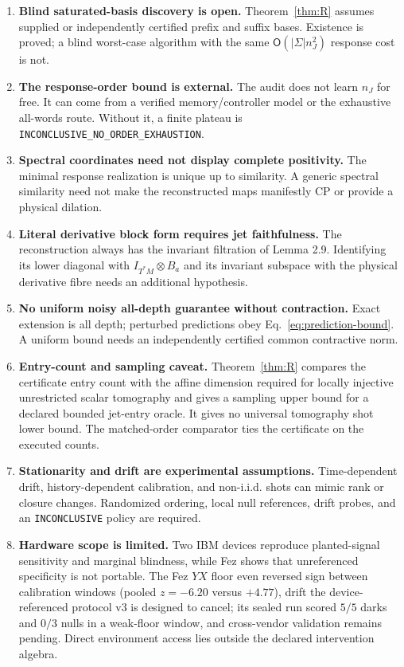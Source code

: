 \documentclass[aps,prl,reprint,superscriptaddress,nofootinbib]{revtex4-2}
\begin{document}
\begin{enumerate}
\item[O1.] \textbf{Blind saturated-basis discovery is open.}  Theorem~\ref{thm:R} assumes supplied or independently certified prefix and suffix bases.  Existence is proved; a blind worst-case algorithm with the same $\mathsf O(|\Sigma|n_J^2)$ response cost is not.

\item[O2.] \textbf{The response-order bound is external.}  The audit does not learn $n_J$ for free.  It can come from a verified memory/controller model or the exhaustive all-words route.  Without it, a finite plateau is
\texttt{INCONCLUSIVE\_}\allowbreak\texttt{NO\_ORDER\_}\allowbreak\texttt{EXHAUSTION}.

\item[O3.] \textbf{Spectral coordinates need not display complete positivity.}  The minimal response realization is unique up to similarity.  A generic spectral similarity need not make the reconstructed maps manifestly CP or provide a physical dilation.

\item[O4.] \textbf{Literal derivative block form requires jet faithfulness.}  The reconstruction always has the invariant filtration of Lemma 2.9.  Identifying its lower diagonal with $I_{T^*M}\otimes B_a$ and its invariant subspace with the physical derivative fibre needs an additional hypothesis.

\item[O5.] \textbf{No uniform noisy all-depth guarantee without contraction.}  Exact extension is all depth; perturbed predictions obey Eq.~\eqref{eq:prediction-bound}.  A uniform bound needs an independently certified common contractive norm.

\item[O6.] \textbf{Entry-count and sampling caveat.}  Theorem~\ref{thm:R} compares the certificate entry count with the affine dimension required for locally injective unrestricted scalar tomography and gives a sampling upper bound for a declared bounded jet-entry oracle.  It gives no universal tomography shot lower bound.  The matched-order comparator ties the certificate on the executed counts.

\item[O7.] \textbf{Stationarity and drift are experimental assumptions.}  Time-dependent drift, history-dependent calibration, and non-i.i.d. shots can mimic rank or closure changes.  Randomized ordering, local null references, drift probes, and an \texttt{INCONCLUSIVE} policy are required.

\item[O8.] \textbf{Hardware scope is limited.}  Two IBM devices reproduce planted-signal sensitivity and marginal blindness, while Fez shows that unreferenced specificity is not portable.  The Fez $YX$ floor even reversed sign between calibration windows (pooled $z=-6.20$ versus $+4.77$), drift the device-referenced protocol v3 is designed to cancel; its sealed run scored $5/5$ darks and $0/3$ nulls in a weak-floor window, and cross-vendor validation remains pending.  Direct environment access lies outside the declared intervention algebra.
\end{enumerate}
\end{document}
